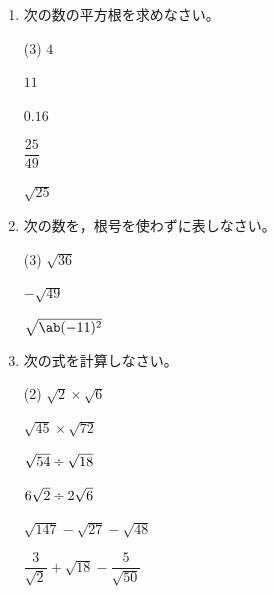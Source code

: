 \documentclass[titlepage,article,paper=b4,twocolumn]{jlreq}
\newcommand{\Div}{\mathbin{\textrm{\textdiv}}}
\begin{document}
\pagestyle{examQ}
\setcounter{page}{1}
\begin{enumerate}[label=\arabic*.]
\setlength{\labelsep}{\zw}
\item 次の数の平方根を求めなさい。
\vspace{5mm}
\begin{tasks}[label=(\arabic*)](3)
\task $4$
\vspace{5mm}

\task $11$
\vspace{5mm}

\task $0.16$
\vspace{5mm}

\task $\dfrac{25}{49}$
\vspace{5mm}

\task $\sqrt{25}$
\vspace{5mm}
\end{tasks}
\vfill


\item 次の数を，根号を使わずに表しなさい。
\vspace{5mm}
\begin{tasks}[label=(\arabic*)](3)
\task $\sqrt{36}$
\vspace{5mm}

\task $-\sqrt{49}$
\vspace{5mm}

\task $\sqrt{\ab(-11)^{2}}$
\vspace{5mm}
\end{tasks}
\vfill


\item 次の式を計算しなさい。
\vspace{5mm}
\begin{tasks}[label=(\arabic*)](2)
\task $\sqrt{2} \times \sqrt{6}$
\vspace{5mm}

\task $\sqrt{45} \times \sqrt{72}$
\vspace{5mm}

\task $\sqrt{54} \Div \sqrt{18}$
\vspace{5mm}

\task $6\sqrt{2} \Div 2\sqrt{6}$
\vspace{5mm}

\task $\sqrt{147} - \sqrt{27} - \sqrt{48}$
\vspace{5mm}

\task $\dfrac{3}{\sqrt{2}} + \sqrt{18} - \dfrac{5}{\sqrt{50}}$
\vspace{5mm}
\end{tasks}


\end{enumerate}
\end{document}
